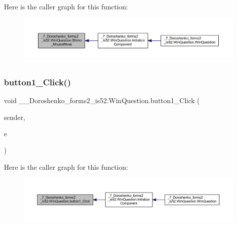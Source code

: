 Here is the caller graph for this function\+:
\nopagebreak
\begin{figure}[H]
\begin{center}
\leavevmode
\includegraphics[width=350pt]{class__7___doroshenko__forms2__is52_1_1_win_question_ab81a4bed4ecc573353c189976316a282_icgraph}
\end{center}
\end{figure}
\hypertarget{class__7___doroshenko__forms2__is52_1_1_win_question_afa7b81836252b133aaec65147788b6c8}{}\label{class__7___doroshenko__forms2__is52_1_1_win_question_afa7b81836252b133aaec65147788b6c8} 
\subsubsection{\texorpdfstring{button1\+\_\+\+Click()}{button1\_Click()}}
{\footnotesize\ttfamily void \+\_\+\_\+\+Doroshenko\+\_\+forms2\+\_\+is52.\+Win\+Question.\+button1\+\_\+\+Click (\begin{DoxyParamCaption}\item[{object}]{sender,  }\item[{Event\+Args}]{e }\end{DoxyParamCaption})\hspace{0.3cm}{\ttfamily [private]}}

Here is the caller graph for this function\+:
\nopagebreak
\begin{figure}[H]
\begin{center}
\leavevmode
\includegraphics[width=350pt]{class__7___doroshenko__forms2__is52_1_1_win_question_afa7b81836252b133aaec65147788b6c8_icgraph}
\end{center}
\end{figure}
\hypertarget{class__7___doroshenko__forms2__is52_1_1_win_question_a93e9d7abadf814c67abe1da4b406039b}{}\label{class__7___doroshenko__forms2__is52_1_1_win_question_a93e9d7abadf814c67abe1da4b406039b} 
